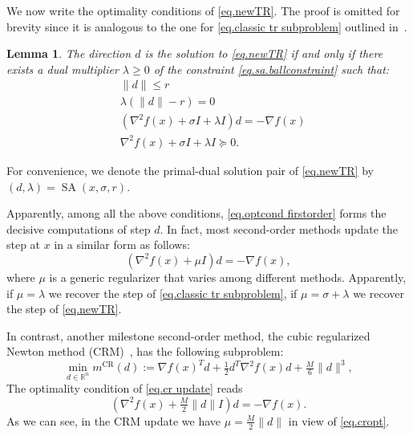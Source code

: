 \documentclass{article}
\theoremstyle{plain}
\newtheorem{lemma}[theorem]{Lemma}
\theoremstyle{definition}
\theoremstyle{remark}
\begin{document}
We now write the optimality conditions of \eqref{eq.newTR}. The proof is omitted for brevity since it is analogous to the one for \eqref{eq.classic tr subproblem} outlined in~\citet[Section 3]{conn2000trust}.
\begin{lemma}\label{lem.optimal condition}
    The direction $d$ is the solution to \eqref{eq.newTR} if and only if there exists a dual multiplier $\lambda \geq 0$ of the constraint \eqref{eq.sa.ballconstraint} such that: \begin{subequations}\label{eq.sa}
        \begin{align}
            \label{eq.optcond primal}
             & \| d\| \leq r                                                       \\
            \label{eq.optcond coml slack}
             & \lambda \left(\|d\|-r \right)=0                                     \\ \label{eq.optcond firstorder}
             & \left(\nabla^2 f(x) + \sigma I + \lambda I \right) d = -\nabla f(x) \\
            \label{eq.optcond secondorder}
             & \nabla^2 f(x) + \sigma I + \lambda I \succeq 0.
        \end{align}
    \end{subequations}
\end{lemma}

For convenience, we denote the primal-dual solution pair of \eqref{eq.newTR} by $(d,\lambda) = \operatorname{SA}(x, \sigma, r)$.

Apparently, among all the above conditions, \eqref{eq.optcond firstorder} forms the decisive computations of step $d$. In fact, most second-order methods update the step at $x$ in a similar form as follows:
\begin{equation}
    \label{eq.second-order update}
    \left (\nabla^2 f(x) + \mu I \right )d = -\nabla f(x),
\end{equation}
where $\mu$ is a generic regularizer that varies among different methods. Apparently, if $\mu=\lambda$ we recover the step of \eqref{eq.classic tr subproblem}, if $\mu = \sigma+\lambda$ we recover the step of \eqref{eq.newTR}.

In contrast, another milestone second-order method, the cubic regularized Newton method (CRM)~\cite{nesterov2006cubic}, has the following subproblem:
\begin{equation}
    \label{eq.cr update}
    \min_{d\in\mathbb{R}^n} m^{\text{CR}}(d):=\nabla f(x)^Td+\tfrac{1}{2}d^T\nabla^2 f(x)d+\tfrac{M}{6}\|d\|^3,
\end{equation}
The optimality condition of \eqref{eq.cr update} reads
\begin{equation}\label{eq.cropt}
    (\nabla^2 f(x) + \tfrac{M}{2}\|d\| I)d = -\nabla f(x).
\end{equation}
As we can see, in the CRM update we have $\mu = \frac{M}{2}\|d\|$ in view of \eqref{eq.cropt}.
\end{document}
